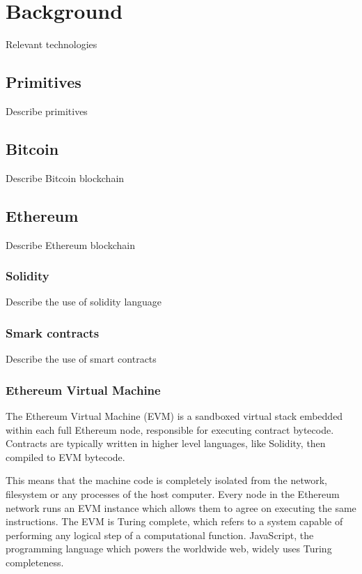 \documentclass{article}
\begin{document}
  \section{Background}

  Relevant technologies

  \subsection{Primitives}

  Describe primitives

  \subsection{Bitcoin}

  Describe Bitcoin blockchain

  \subsection{Ethereum}

  Describe Ethereum blockchain

  \subsubsection{Solidity}

  Describe the use of solidity language

  \subsubsection{Smark contracts}

  Describe the use of smart contracts

  \subsubsection{Ethereum Virtual Machine}

  The Ethereum Virtual Machine (EVM) is a sandboxed virtual stack
  embedded within each full Ethereum node, responsible for executing
  contract bytecode. Contracts are typically written in higher level
  languages, like Solidity, then compiled to EVM bytecode.

  This means that the machine code is completely isolated from the
  network, filesystem or any processes of the host computer. Every node
  in the Ethereum network runs an EVM instance which allows them to
  agree on executing the same instructions. The EVM is Turing complete,
  which refers to a system capable of performing any logical step of a
  computational function. JavaScript, the programming language which
  powers the worldwide web, widely uses Turing completeness.
\end{document}
